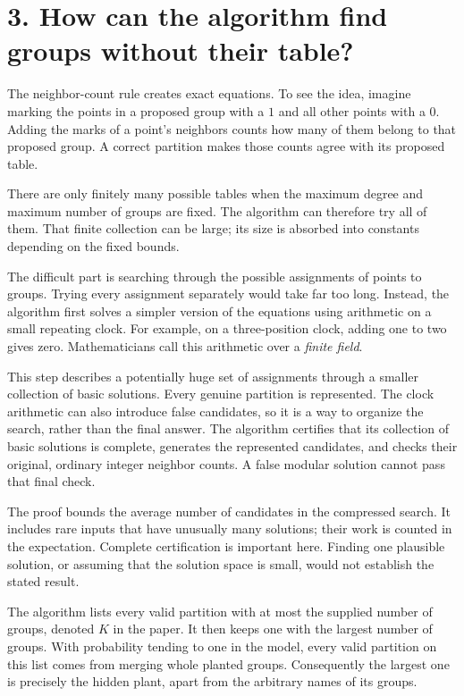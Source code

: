 \documentclass[11pt]{article}
\begin{document}
\newpage
\section*{3. How can the algorithm find groups without their table?}
The neighbor-count rule creates exact equations. To see the idea,
imagine marking the points in a proposed group with a $1$ and all
other points with a $0$. Adding the marks of a point's neighbors
counts how many of them belong to that proposed group. A correct
partition makes those counts agree with its proposed table.

There are only finitely many possible tables when the maximum degree
and maximum number of groups are fixed. The algorithm can therefore
try all of them. That finite collection can be large; its size is
absorbed into constants depending on the fixed bounds.

The difficult part is searching through the possible assignments of
points to groups. Trying every assignment separately would take far
too long. Instead, the algorithm first solves a simpler version of
the equations using arithmetic on a small repeating clock. For
example, on a three-position clock, adding one to two gives zero.
Mathematicians call this arithmetic over a \emph{finite field}.

This step describes a potentially huge set of assignments through a
smaller collection of basic solutions. Every genuine partition is
represented. The clock arithmetic can also introduce false candidates,
so it is a way to organize the search, rather than the final answer.
The algorithm certifies that its collection of basic solutions is
complete, generates the represented candidates, and checks their
original, ordinary integer neighbor counts. A false modular solution
cannot pass that final check.

The proof bounds the average number of candidates in the compressed
search. It includes rare inputs that have unusually many solutions;
their work is counted in the expectation. Complete certification is
important here. Finding one plausible solution, or assuming that the
solution space is small, would not establish the stated result.

The algorithm lists every valid partition with at most the supplied
number of groups, denoted $K$ in the paper. It then keeps one with
the largest number of groups. With probability tending to one in the
model, every valid partition on this list comes from merging whole
planted groups. Consequently the largest one is precisely the hidden
plant, apart from the arbitrary names of its groups.
\end{document}
